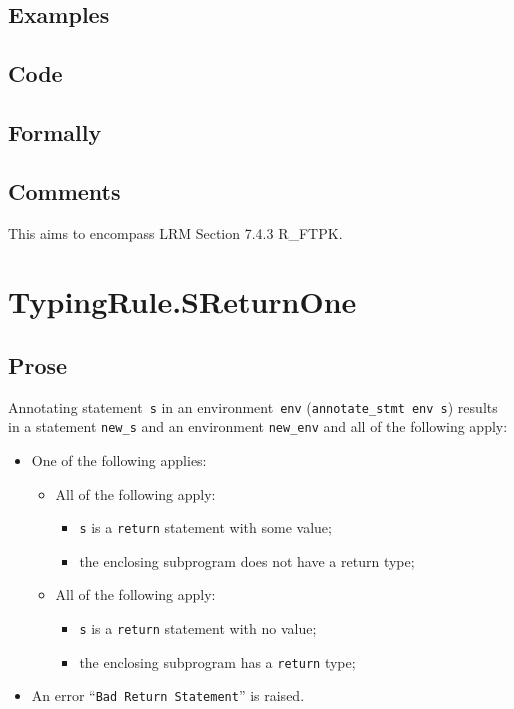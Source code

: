 \documentclass{book}
\begin{document}
  \subsection{Examples}

  \subsection{Code}

  \subsection{Formally}

  \subsection{Comments}
    This aims to encompass LRM Section 7.4.3 R\_FTPK.


\section{TypingRule.SReturnOne \label{sec:TypingRule.SReturnOne}}

  \subsection{Prose}
Annotating statement~\texttt{s} in an environment~\texttt{env}
(\texttt{annotate\_stmt env s}) results in a statement \texttt{new\_s} and an
environment \texttt{new\_env} and all of the following apply:
   \begin{itemize}
   \item One of the following applies:
     \begin{itemize}
     \item All of the following apply:
       \begin{itemize}
       \item \texttt{s} is a \texttt{return} statement with some value;
       \item the enclosing subprogram does not have a return type;
       \end{itemize}
     \item All of the following apply:
       \begin{itemize}
       \item \texttt{s} is a \texttt{return} statement with no value;
       \item the enclosing subprogram has a \texttt{return} type;
       \end{itemize}
     \end{itemize}
   \item An error ``\texttt{Bad Return Statement}'' is raised.
   \end{itemize}
\end{document}
